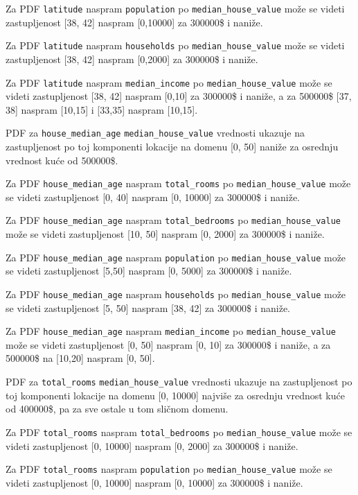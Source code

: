 \documentclass[fontsize=12bp, paper=a4]{scrarticle}
\begin{document}
Za PDF \verb*|latitude| naspram \verb*|population| po \verb|median_house_value| može se videti zastupljenost [38, 42] naspram [0,10000] za 300000\$ i naniže.

Za PDF \verb*|latitude| naspram \verb*|households| po \verb|median_house_value| može se videti zastupljenost [38, 42] naspram [0,2000] za 300000\$ i naniže.

Za PDF \verb*|latitude| naspram \verb*|median_income| po \verb|median_house_value| može se videti zastupljenost [38, 42] naspram [0,10] za 300000\$ i naniže, a za 500000\$ [37, 38] naspram [10,15] i [33,35] naspram [10,15].

PDF za \verb*|house_median_age| \verb*|median_house_value| vrednosti ukazuje na zastupljenost po toj komponenti lokacije na domenu [0, 50] naniže za osrednju vrednost kuće od 500000\$.
 
Za PDF \verb*|house_median_age| naspram \verb*|total_rooms| po \verb|median_house_value| može se videti zastupljenost [0, 40] naspram [0, 10000] za 300000\$ i naniže.

Za PDF \verb*|house_median_age| naspram \verb*|total_bedrooms| po \verb|median_house_value| može se videti zastupljenost [10, 50] naspram [0, 2000]   za 300000\$ i naniže.

Za PDF \verb*|house_median_age| naspram \verb*|population| po \verb|median_house_value| može se videti zastupljenost [5,50] naspram [0, 5000]  za 300000\$ i naniže.

Za PDF \verb*|house_median_age| naspram \verb*|households| po \verb|median_house_value| može se videti zastupljenost [5, 50] naspram [38, 42] za 300000\$ i naniže.

Za PDF \verb*|house_median_age| naspram \verb*|median_income| po \verb|median_house_value| može se videti zastupljenost [0, 50] naspram [0, 10] za 300000\$ i naniže, a za 500000\$ na [10,20] naspram [0, 50].

PDF za \verb*|total_rooms| \verb*|median_house_value| vrednosti ukazuje na zastupljenost po toj komponenti lokacije na domenu [0, 10000] najviše za osrednju vrednost kuće od 400000\$, pa za sve ostale u tom sličnom domenu.

Za PDF \verb*|total_rooms| naspram \verb*|total_bedrooms| po \verb|median_house_value| može se videti zastupljenost [0, 10000] naspram [0, 2000] za 300000\$ i naniže.

Za PDF \verb*|total_rooms| naspram \verb*|population| po \verb|median_house_value| može se videti zastupljenost [0, 10000] naspram [0, 10000] za 300000\$ i naniže.
\end{document}
